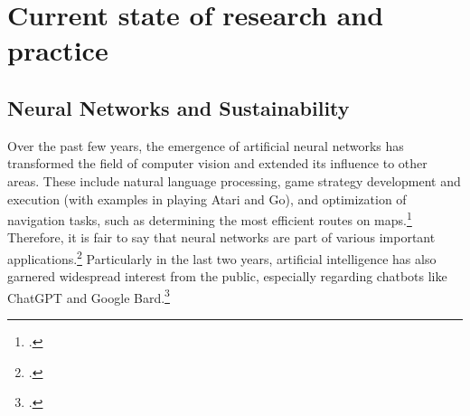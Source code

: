\chapter{Current state of research and practice}

\section{Neural Networks and Sustainability}

Over the past few years, the emergence of artificial neural networks has transformed
the field of computer vision and extended its influence to other areas. These include natural language processing,
game strategy development and execution (with examples in playing Atari and Go),
and optimization of navigation tasks, such as determining the most efficient routes on maps.\footcite[cf.][305]{cichyDeepNeuralNetworks2019}
Therefore, it is fair to say that neural networks are part of various important applications.\footcite[cf.][1513]{gawlikowskiSurveyUncertaintyDeep2023}
Particularly in the last two years, artificial intelligence has also garnered widespread interest from the public, especially regarding chatbots like ChatGPT and Google Bard.\footcite[cf.][1-2]{singhChatGPTGoogle2023}  

